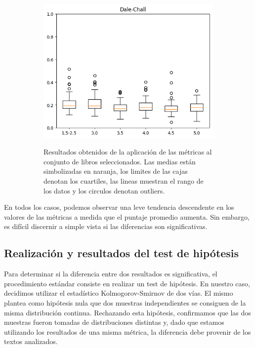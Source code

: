 \documentclass[12pt,journal,compsoc]{IEEEtran}
\begin{document}
\begin{figure}[H]
\begin{subfigure}{0.27\textwidth}
\includegraphics[scale=0.41]{../unigrams/scripts/boxplots/Dale-Chall.png}
\end{subfigure}
\caption{\small \textit{Boxplots sobre los resultados normalizados de cada métrica}}
\medskip
\begin{subfigure}{0.80\textwidth}
\footnotesize Resultados obtenidos de la aplicación de las métricas al conjunto de libros seleccionados. Las medias están simbolizadas en naranja, los limites de las cajas denotan los cuartiles, las lineas muestran el rango de los datos y los circulos denotan outliers.
\end{subfigure}
\label{fig:boxplots}
\end{figure}

En todos los casos, podemos observar una leve tendencia descendente en los valores de las métricas a medida que el puntaje promedio aumenta. Sin embargo, es difícil discernir a simple vista si las diferencias son significativas.

\subsection{Realización y resultados del test de hipótesis}

Para determinar si la diferencia entre dos resultados es significativa, el procedimiento estándar consiste en realizar un test de hipótesis. En nuestro caso, decidimos utilizar el estadístico Kolmogorov-Smirnov de dos vías. El mismo plantea como hipótesis nula que dos muestras independientes se consiguen de la misma distribución continua. Rechazando esta hipótesis, confirmamos que las dos muestras fueron tomadas de distribuciones distintas y, dado que estamos utilizando los resultados de una misma métrica, la diferencia debe provenir de los textos analizados.
\end{document}
